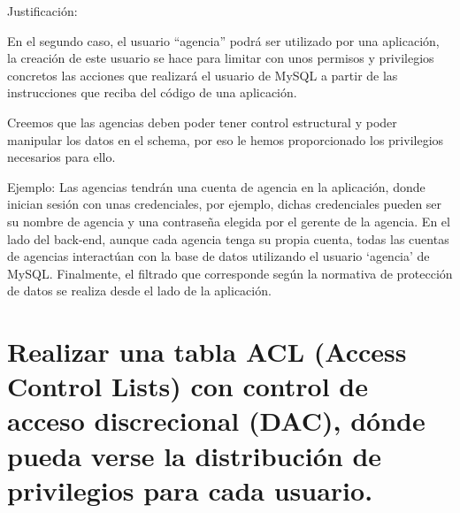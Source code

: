 	Justificación:
	
	\newp En el segundo caso, el usuario “agencia” podrá ser utilizado por una aplicación, la creación de este usuario se hace para limitar con unos permisos y privilegios concretos las acciones que realizará el usuario de MySQL a partir de las instrucciones que reciba del código de una aplicación. 
	
	\newp Creemos que las agencias deben poder tener control estructural y poder manipular los datos en el schema, por eso le hemos proporcionado los privilegios necesarios para ello. 
	
	\newp Ejemplo:
	\newp Las agencias tendrán una cuenta de agencia en la aplicación, donde inician sesión con unas credenciales, por ejemplo, dichas credenciales pueden ser su nombre de agencia y una contraseña elegida por el gerente de la agencia. En el lado del back-end, aunque cada agencia tenga su propia cuenta, todas las cuentas de agencias interactúan con la base de datos utilizando el usuario ‘agencia’ de MySQL. Finalmente, el filtrado que corresponde según la normativa de protección de datos se realiza desde el lado de la aplicación.
	
\newpage
\section{Realizar una tabla ACL (Access Control Lists) con control de acceso discrecional (DAC), dónde pueda verse la distribución de privilegios para cada usuario.}

